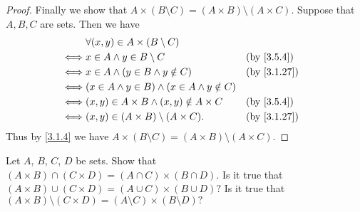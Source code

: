 \begin{proof}
  Finally we show that \(A \times (B \setminus C) = (A \times B) \setminus (A \times C)\).
  Suppose that \(A, B, C\) are sets.
  Then we have
  \begin{align*}
         & \forall (x, y) \in A \times (B \setminus C)                                             \\
    \iff & x \in A \land y \in B \setminus C                        &  & \text{(by \cref{3.5.4})}  \\
    \iff & x \in A \land (y \in B \land y \notin C)                 &  & \text{(by \cref{3.1.27})} \\
    \iff & (x \in A \land y \in B) \land (x \in A \land y \notin C)                                \\
    \iff & (x, y) \in A \times B \land (x, y) \notin A \times C     &  & \text{(by \cref{3.5.4})}  \\
    \iff & (x, y) \in (A \times B) \setminus (A \times C).          &  & \text{(by \cref{3.1.27})}
  \end{align*}
  Thus by \cref{3.1.4} we have \(A \times (B \setminus C) = (A \times B) \setminus (A \times C)\).
\end{proof}

\begin{ex}\label{ex:3.5.5}
  Let \(A\), \(B\), \(C\), \(D\) be sets.
  Show that \((A \times B) \cap (C \times D) = (A \cap C) \times (B \cap D)\).
  Is it true that \((A \times B) \cup (C \times D) = (A \cup C) \times (B \cup D)?\)
  Is it true that \((A \times B) \setminus (C \times D) = (A \setminus C) \times (B \setminus D)?\)
\end{ex}

